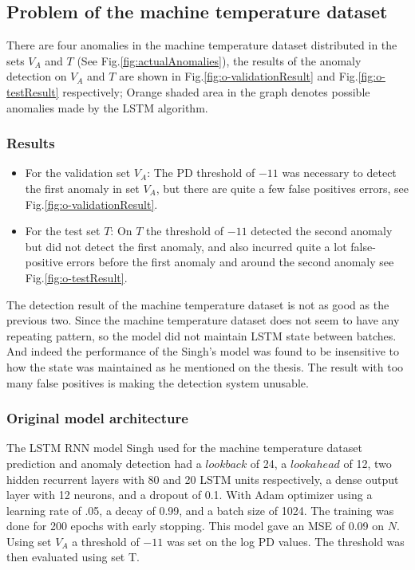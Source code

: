 \documentclass{article}
\begin{document}
\subsection{Problem of the machine temperature dataset}

There are four anomalies in the machine temperature
dataset distributed in the sets $V_A$ and $T$ (See
Fig.\ref{fig:actualAnomalies}), the results of the anomaly
detection on $V_A$ and $T$ are shown in
Fig.\ref{fig:o-validationResult} and Fig.\ref{fig:o-testResult} respectively;
Orange shaded area in the graph denotes possible anomalies made by the LSTM
algorithm. 

\subsubsection{Results}
\label{originalresults}
\begin{itemize}
	\item For the validation set $V_A$: The PD threshold of $-11$ was necessary to
detect the first anomaly in set $V_A$, but there are quite a few false
positives errors, see Fig.\ref{fig:o-validationResult}.
	\item For the test set $T$: On $T$ the threshold of $-11$ detected the second
anomaly but did not detect the first anomaly, and also incurred quite a lot
false-positive errors before the first anomaly and around the second anomaly
see
Fig.\ref{fig:o-testResult}.
\end{itemize}

The detection result of the machine temperature dataset is not as good as the
previous two. Since the machine temperature dataset does not seem to have any
repeating pattern, so the model did not maintain LSTM state between
batches. And indeed the performance of the Singh's model was found to be
insensitive to how the state was maintained as he mentioned on the thesis.
The result with too many false positives is making the detection
system unusable.

\subsubsection{Original model architecture}
\label{originalmodel}
The LSTM RNN model Singh used for the machine temperature
dataset prediction and anomaly detection had a $lookback$ of 24, a $lookahead$
of 12, two hidden recurrent layers with 80 and 20 LSTM units respectively, a
dense output layer with 12 neurons, and a dropout of 0.1.  With Adam optimizer
using a learning rate of .05, a decay of
0.99, and a batch size of 1024. The training was done for 200 epochs with early
stopping. This model gave an MSE of 0.09 on $N$.
Using set $V_A$ a threshold of $-11$ was set on the log PD values. The
threshold was then evaluated using set T.
\end{document}
